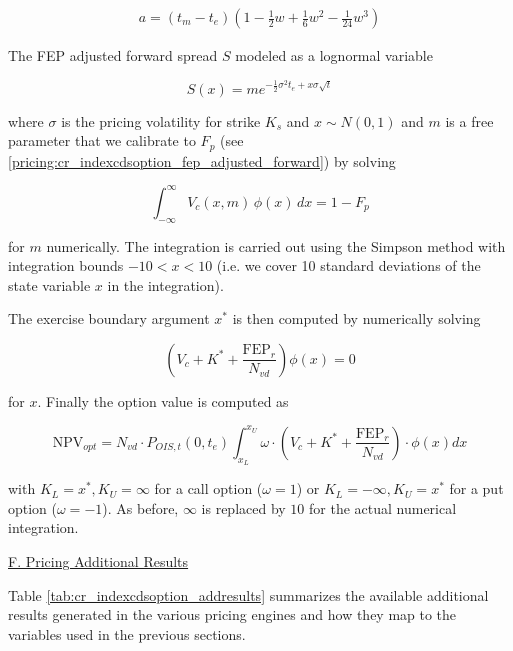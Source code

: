 \begin{eqnarray}
a = (t_m-t_e) \left(1 - \frac{1}{2}w+\frac{1}{6}w^2-\frac{1}{24}w^3\right)
\end{eqnarray}

The FEP adjusted forward spread $S$ modeled as a lognormal variable

\begin{equation}
S(x) = m e^{-\frac{1}{2} \sigma^2 t_e + x \sigma \sqrt{t}}
\end{equation}

where $\sigma$ is the pricing volatility for strike $K_s$ and $x \sim N(0,1)$ and $m$ is a free parameter that we
calibrate to $F_p$ (see \ref{pricing:cr_indexcdsoption_fep_adjusted_forward}) by solving

\begin{equation}
\int_{-\infty}^{\infty} V_c(x,m) \, \phi(x) \, dx = 1 - F_p
\end{equation}

for $m$ numerically. The integration is carried out using the Simpson method with integration bounds $-10 < x < 10$
(i.e. we cover 10 standard deviations of the state variable $x$ in the integration). 

The exercise boundary argument $x^*$ is then computed by numerically solving

\begin{equation}
\left( V_c + K^* + \frac{\text{FEP}_r}{N_{vd}} \right) \phi(x) = 0
\end{equation}

for $x$. Finally the option value is computed as

\begin{equation}
\text{NPV}_{opt} = N_{vd} \cdot P_{OIS,t}(0,t_e) \int_{x_L}^{x_U} \omega \cdot \left(V_c + K^* + \frac{\text{FEP}_r}{N_{vd}}\right) \cdot \phi(x) dx
\end{equation}

with $K_L= x^*, K_U=\infty$ for a call option ($\omega=1$) or $K_L=-\infty, K_U=x^*$ for a put option ($\omega=-1$). As
before, $\infty$ is replaced by $10$ for the actual numerical integration.

\underline{F. Pricing Additional Results}

Table \ref{tab:cr_indexcdsoption_addresults} summarizes the available additional results generated in the various
pricing engines and how they map to the variables used in the previous sections.

